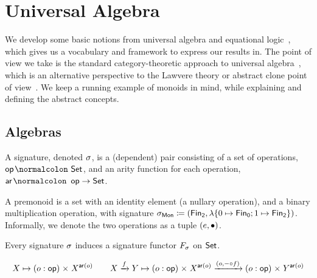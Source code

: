 
\section{Universal Algebra}
\label{sec:universal-algebra}

We develop some basic notions from universal algebra and equational
logic~\cite{birkhoffStructureAbstractAlgebras1935},
which gives us a vocabulary and framework to express our results in.
%
The point of view we take is the standard category-theoretic approach to universal algebra~\cite{waltersCategoricalApproachUniversal1970},
which is an alternative perspective to the Lawvere theory or abstract clone point of view~\cite{lawvereFunctorialSemanticsAlgebraic1963,hylandCategoryTheoreticUnderstanding2007}.
%
We keep a running example of monoids in mind, while explaining and defining the abstract concepts.

\subsection{Algebras}
\label{sec:universal-algebra:algebras}

\begin{definition}
    \label{algebra:signature}
    \label{def:signature}
    A signature, denoted $\sigma$, is a (dependent) pair consisting of
    a set of operations, $\op\colon \Set$, and
    an arity function for each operation, $\ar\colon \op \to \Set$.
\end{definition}

\begin{example}
    A premonoid is a set with an identity element (a nullary operation), and a binary multiplication operation,
    with signature $\sigMon \defeq (\Fin[2],\lambda \{0 \mapsto \Fin[0] ; 1 \mapsto \Fin[2] \})$.
    Informally, we denote the two operations as a tuple $(e,\mathbin{\bullet})$.
\end{example}

\noindent
Every signature $\sigma$ induces a signature functor $\Sig$ on $\mathsf{Set}$.
\begin{definition}
    \label{def:signature-functor}
    \[
        X \mapsto \dsum{o:\op}{X^{\ar(o)}}
        \qquad
        X \xto{f} Y \mapsto
        \dsum{o:\op}{X^{\ar(o)}}
        \xto{(o, \blank \comp f)}
        \dsum{o:\op}{Y^{\ar(o)}}
    \]
\end{definition}


